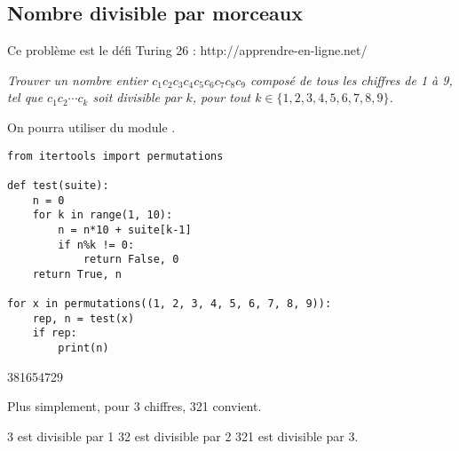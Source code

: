 \subsection{Nombre divisible par morceaux}
{\sf Ce problème est le défi Turing 26 : http://apprendre-en-ligne.net/}
\begin{Exercise}
\it Trouver un nombre entier $c_1c_2c_3c_4c_5c_6c_7c_8c_9$ composé de tous les chiffres de 1 à 9, tel que $c_1c_2\cdots c_k$ soit divisible par $k$, pour tout $k \in \{1, 2, 3, 4, 5, 6,7, 8,9\}$.

On pourra utiliser  du module .
\end{Exercise}
\begin{Answer}
\begin{lstlisting}
from itertools import permutations

def test(suite):
    n = 0
    for k in range(1, 10):
        n = n*10 + suite[k-1]
        if n%k != 0:
            return False, 0
    return True, n

for x in permutations((1, 2, 3, 4, 5, 6, 7, 8, 9)):
    rep, n = test(x)
    if rep:
        print(n)
\end{lstlisting}
381654729
\end{Answer}
Plus simplement, pour 3 chiffres, 321 convient.

3 est divisible par 1
32 est divisible par 2
321 est divisible par 3.
